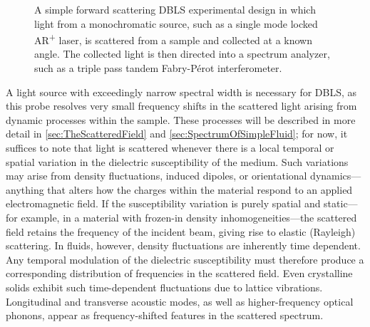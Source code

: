 \begin{figure}[!htbp]
	\centering
	\caption{A simple forward scattering DBLS experimental design in which light from a monochromatic source, such as a single mode locked AR\textsuperscript{+} laser, is scattered from a sample and collected at a known angle.  The collected light is then directed into a spectrum analyzer, such as a triple pass tandem Fabry-P\'erot interferometer.}\label{figure:SimpleDLS}
\end{figure}

A light source with exceedingly narrow spectral width is necessary for DBLS, as this probe resolves very small frequency shifts in the scattered light arising from dynamic processes within the sample. These processes will be described in more detail in \sect \nolinebreak \ref{sec:TheScatteredField} and \nolinebreak \ref{sec:SpectrumOfSimpleFluid}; for now, it suffices to note that light is scattered whenever there is a local temporal or spatial variation in the dielectric susceptibility of the medium. Such variations may arise from density fluctuations, induced dipoles, or orientational dynamics—anything that alters how the charges within the material respond to an applied electromagnetic field. If the susceptibility variation is purely spatial and static—for example, in a material with frozen-in density inhomogeneities—the scattered field retains the frequency of the incident beam, giving rise to elastic (Rayleigh) scattering. In fluids, however, density fluctuations are inherently time dependent. Any temporal modulation of the dielectric susceptibility must therefore produce a corresponding distribution of frequencies in the scattered field. Even crystalline solids exhibit such time-dependent fluctuations due to lattice vibrations. Longitudinal and transverse acoustic modes, as well as higher-frequency optical phonons, appear as frequency-shifted features in the scattered spectrum.

